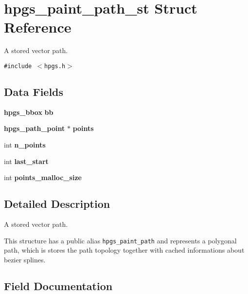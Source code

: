 \section{hpgs\_\-paint\_\-path\_\-st Struct Reference}
\label{structhpgs__paint__path__st}
A stored vector path.  


{\tt \#include $<$hpgs.h$>$}

\subsection*{Data Fields}
\begin{CompactItemize}
\item 
{\bf hpgs\_\-bbox} \textbf{bb}\label{structhpgs__paint__path__st_f4ae3fb2b6fd1725377c0399b8506b23}

\end{CompactItemize}
\begin{Indent}{\bf }\par
\begin{CompactItemize}
\item 
{\bf hpgs\_\-path\_\-point} $\ast$ {\bf points}
\item 
int \textbf{n\_\-points}\label{structhpgs__paint__path__st_3180496eb7ad6dd7bd9a84a6393f9ea9}

\item 
int \textbf{last\_\-start}\label{structhpgs__paint__path__st_b74ad95c8195e77194d3a79191823be0}

\item 
int \textbf{points\_\-malloc\_\-size}\label{structhpgs__paint__path__st_d251d2fedecc7e918c83cfd05d4fb358}

\end{CompactItemize}
\end{Indent}


\subsection{Detailed Description}
A stored vector path. 

This structure has a public alias {\tt hpgs\_\-paint\_\-path} and represents a polygonal path, which is stores the path topology together with cached informations about bezier splines. 

\subsection{Field Documentation}
